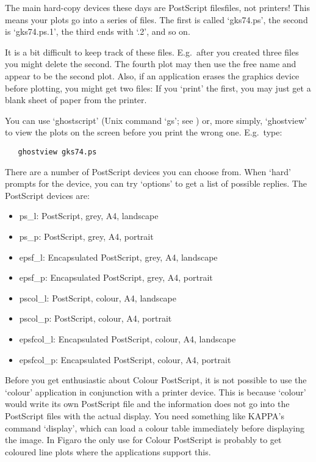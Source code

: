    The main hard-copy devices these days are PostScript
   files\latorhtm{---}{-}files,
   not printers! This means your plots go into a series of files. The
   first is called `gks74.ps', the second is `gks74.ps.1', the third
   ends with `.2', and so on.

   It is a bit difficult to keep track of these files. E.g.\ after you
   created three files you might delete the second. The fourth plot may
   then use the free name and appear to be the second plot. Also, if an
   application erases the graphics device before plotting, you might get
   two files: If you `print' the first, you may just get a blank sheet
   of paper from the printer.

   You can use `ghostscript' (Unix command `gs'; see
   ) or, more simply, `ghostview' to view the
   plots on the screen before you print the wrong one.  E.g.\ type:

\begin{verbatim}
   ghostview gks74.ps
\end{verbatim}

   There are a number of PostScript devices you can choose from. When
   `hard' prompts for the device, you can try `options' to get a list of
   possible replies. The PostScript devices are:

\begin{itemize}
\item   ps\_l: PostScript, grey, A4, landscape
\item   ps\_p: PostScript, grey, A4, portrait
\item   epsf\_l: Encapsulated PostScript, grey, A4, landscape
\item   epsf\_p: Encapsulated PostScript, grey, A4, portrait
\item   pscol\_l: PostScript, colour, A4, landscape
\item   pscol\_p: PostScript, colour, A4, portrait
\item   epsfcol\_l: Encapsulated PostScript, colour, A4, landscape
\item   epsfcol\_p: Encapsulated PostScript, colour, A4, portrait
\end{itemize}

   Before you get enthusiastic about Colour PostScript, it is not
   possible to use the `colour' application in conjunction with a
   printer device. This is because `colour' would write its own
   PostScript file and the information does not go into the PostScript
   files with the actual display. You need something like KAPPA's
   command `display', which can load a colour table immediately before
   displaying the image. In Figaro the only use for Colour PostScript is
   probably to get coloured line plots where the applications support
   this.

